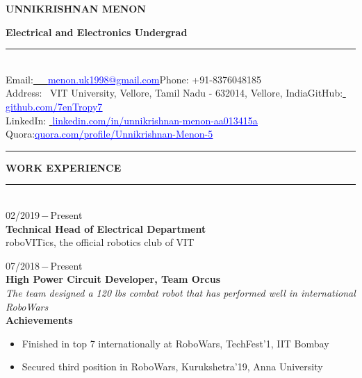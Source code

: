 \documentclass[a4paper, 12pt]{article}
\begin{document}
    \begin{center}
        \Huge{\textbf{UNNIKRISHNAN MENON}}
    \end{center}
    
    \begin{center}
        \textbf{Electrical and Electronics Undergrad}
    \end{center}
    
    \begin{flushleft}
    \noindent\rule{\textwidth}{1pt}\\
        Email:\href{menon.uk1998@gmail.com}{\textcolor{blue}{\,\,\,\,\,\,\, \underline{menon.uk1998@gmail.com}}}\qquad\qquad\qquad\qquad\qquad\qquad\qquad Phone: +91-8376048185\\
        \small{Address:\,\,\, VIT University, Vellore, Tamil Nadu - 632014, Vellore, India}\quad GitHub:\href{github.com/7enTropy7}{\textcolor{blue}{\,\,\underline{github.com/7enTropy7}}}\\LinkedIn: \href{linkedin.com/in/unnikrishnan-menon-aa013415a}{\textcolor{blue}{\,\,\underline{linkedin.com/in/unnikrishnan-menon-aa013415a}}}\\Quora:\href{quora.com/profile/Unnikrishnan-Menon-5}{\textcolor{blue}{\qquad\underline{quora.com/profile/Unnikrishnan-Menon-5}}}\\
        \noindent\rule{\textwidth}{1pt}
    \end{flushleft}
    
    \begin{flushleft}
        \textbf{WORK EXPERIENCE}\\\noindent\rule{\textwidth}{1pt}\\
        02/2019\,$-$\,Present\\
        \textbf{Technical Head of Electrical Department}\\
        roboVITics, the official robotics club of VIT
    \end{flushleft}
    
    \begin{flushleft}
        07/2018\,$-$\,Present\\
        \textbf{High Power Circuit Developer, Team Orcus}\\
        \textit{The team designed a 120 lbs combat robot that has performed well in international RoboWars}\\\textbf{Achievements}\\\begin{itemize}
            \item Finished in top 7 internationally at RoboWars, TechFest'1, IIT Bombay\\
            \item Secured third position in RoboWars, Kurukshetra'19, Anna University
        \end{itemize}
    \end{flushleft}
    
\end{document}
